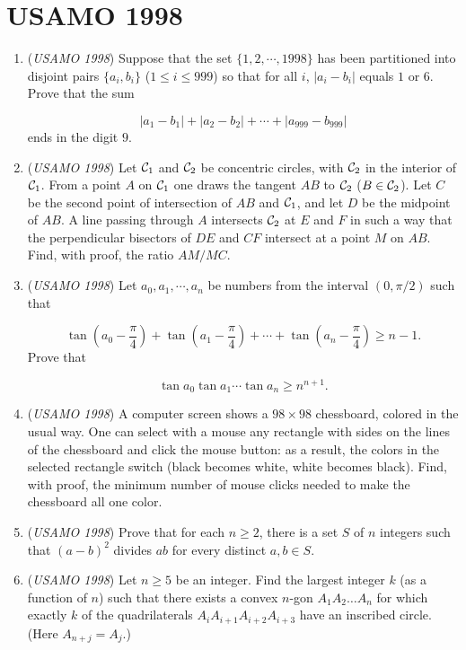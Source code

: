 \section{USAMO 1998}
        \begin{enumerate}
        	\item (\textit{USAMO 1998}) Suppose that the set $\{1,2,\cdots, 1998\}$ has been partitioned into disjoint pairs $\{a_i,b_i\}$ ($1\leq i\leq 999$) so that for all $i$, $|a_i-b_i|$ equals $1$ or $6$. Prove that the sum

 \[|a_1-b_1|+|a_2-b_2|+\cdots +|a_{999}-b_{999}|\]
ends in the digit $9$.


 

	\item (\textit{USAMO 1998}) Let ${\cal C}_1$ and ${\cal C}_2$ be  concentric circles, with ${\cal C}_2$ in the interior of  ${\cal C}_1$. From a point $A$ on ${\cal C}_1$ one draws the tangent $AB$ to ${\cal C}_2$ ($B\in {\cal C}_2$). Let $C$ be the second point of intersection of $AB$ and ${\cal C}_1$, and let $D$ be the midpoint of $AB$. A line passing through $A$ intersects ${\cal C}_2$ at $E$ and $F$ in such a way that the perpendicular  bisectors of $DE$ and $CF$ intersect at a point $M$ on $AB$. Find, with proof,  the ratio $AM/MC$.


 

	\item (\textit{USAMO 1998}) Let $a_0,a_1,\cdots ,a_n$ be numbers from the interval $(0,\pi/2)$ such that

 \[\tan \left(a_0-\frac{\pi}{4}\right)+ \tan \left(a_1-\frac{\pi}{4}\right)+\cdots +\tan \left(a_n-\frac{\pi}{4}\right)\geq n-1.\]
Prove that

 \[\tan a_0\tan a_1 \cdots \tan a_n\geq n^{n+1}.\]


	\item (\textit{USAMO 1998}) A computer screen shows a $98 \times 98$ chessboard, colored in the usual way. One can select with a mouse any rectangle with sides on the lines of the chessboard and click the mouse button: as a result,  the colors in the selected rectangle switch (black becomes white, white becomes black). Find, with proof, the minimum number of mouse clicks needed to make the chessboard all one color.


 

	\item (\textit{USAMO 1998}) Prove that for each $n\geq 2$, there is a set $S$ of $n$ integers such that $(a-b)^2$ divides $ab$ for every distinct $a,b\in S$.


 

	\item (\textit{USAMO 1998}) Let $n \geq 5$ be an integer. Find the largest integer $k$ (as a function of $n$) such that there exists a convex $n$-gon $A_{1}A_{2}\dots A_{n}$ for which exactly $k$ of the quadrilaterals $A_{i}A_{i+1}A_{i+2}A_{i+3}$ have an inscribed circle. (Here $A_{n+j} = A_{j}$.)


 

\end{enumerate}